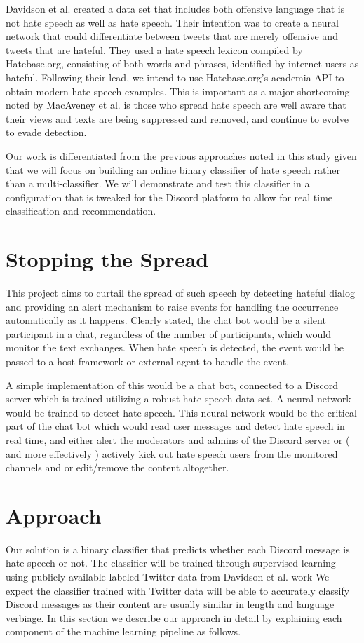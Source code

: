 \documentclass[conference]{sig-alternate-05-2015}
\begin{document}
Davidson et al. created a data set that includes both offensive language that is not hate speech as well as hate speech. Their intention was to create a neural network that could differentiate between tweets that are merely offensive and tweets that are hateful. They used a hate speech lexicon compiled by Hatebase.org, consisting of both words and phrases, identified by internet users as hateful.  Following their lead, we intend to use Hatebase.org's academia API to obtain modern hate speech examples.  This is important as a major shortcoming noted by MacAveney et al.\cite{MacAvaneyetal.} is those who spread hate speech are well aware that their views and texts are being suppressed and removed, and continue to evolve to evade detection.

Our work is differentiated from the previous approaches noted in this study given that we will focus on building an online binary classifier of hate speech rather than a multi-classifier.  We will demonstrate and test this classifier in a configuration that is tweaked for the Discord platform to allow for real time classification and recommendation.

\section{Stopping the Spread}\label{sec:design}
This project aims to curtail the spread of such speech by detecting hateful dialog and providing an alert mechanism to raise events for handling the occurrence automatically as it happens.  Clearly stated, the chat bot would be a silent participant in a chat, regardless of the number of participants, which would monitor the text exchanges.  When hate speech is detected, the event would be passed to a host framework or external agent to handle the event.

A simple implementation of this would be a chat bot, connected to a Discord server which is trained utilizing a robust hate speech data set. A neural network would be trained to detect hate speech. This neural network would be the critical part of the chat bot which would read user messages and detect hate speech in real time, and either alert the moderators and admins of the Discord server or ( and more effectively ) actively kick out hate speech users from the monitored channels and or edit/remove the content altogether.

\section{Approach}\label{sec:approach}
Our solution is a binary classifier that predicts whether each Discord message is hate speech or not. The classifier will be trained through supervised learning using publicly available labeled Twitter data from Davidson et al. work \cite{Davidsonetal.}
We expect the classifier trained with Twitter data will be able to accurately classify Discord messages as their content are usually similar in length and language verbiage. 
In this section we describe our approach in detail by explaining each component of the machine learning pipeline as follows.
 
\end{document}
